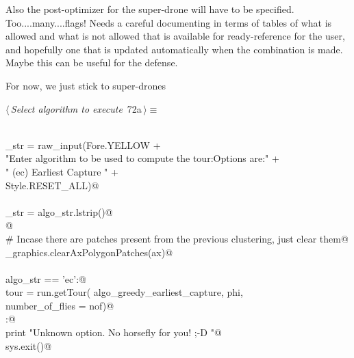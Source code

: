 \documentclass[11.5pt]{report}
\begin{document}
Also the post-optimizer for the super-drone will have to be specified. Too....many....flags! 
Needs a careful documenting in terms of tables of what is allowed and what is not allowed
that is available for ready-reference for the user, and hopefully one that is updated
automatically when the combination is made. Maybe this can be useful for the defense.  

For now, we just stick to super-drones

\begin{flushleft} \small
\begin{minipage}{\linewidth}\label{scrap105}\raggedright\small
{} $\langle\,${\itshape Select algorithm to execute}\nobreak\ {\footnotesize {72a}}$\,\rangle\equiv$
\vspace{-1ex}
\begin{list}{}{} \item
\mbox{}\verb@@\\
\mbox{}\verb@algo_str = raw_input(Fore.YELLOW                                             +\@\\
\mbox{}\verb@        "Enter algorithm to be used to compute the tour:\n Options are:\n"   +\@\\
\mbox{}\verb@        " (ec)   Earliest Capture \n"                                        +\@\\
\mbox{}\verb@        Style.RESET_ALL)@\\
\mbox{}\verb@@\\
\mbox{}\verb@algo_str = algo_str.lstrip()@\\
\mbox{}\verb@ @\\
\mbox{}\verb@# Incase there are patches present from the previous clustering, just clear them@\\
\mbox{}\verb@utils_graphics.clearAxPolygonPatches(ax)@\\
\mbox{}\verb@@\\
\mbox{}\verb@if   algo_str == 'ec':@\\
\mbox{}\verb@      tour = run.getTour( algo_greedy_earliest_capture, phi, \@\\
\mbox{}\verb@                          number_of_flies = nof)@\\
\mbox{}\verb@else:@\\
\mbox{}\verb@      print "Unknown option. No horsefly for you! ;-D "@\\
\mbox{}\verb@      sys.exit()@\\
\mbox{}\verb@@\\
\mbox{}\verb@@\\

\end{list}
\end{minipage}
\end{flushleft}
\end{document}
